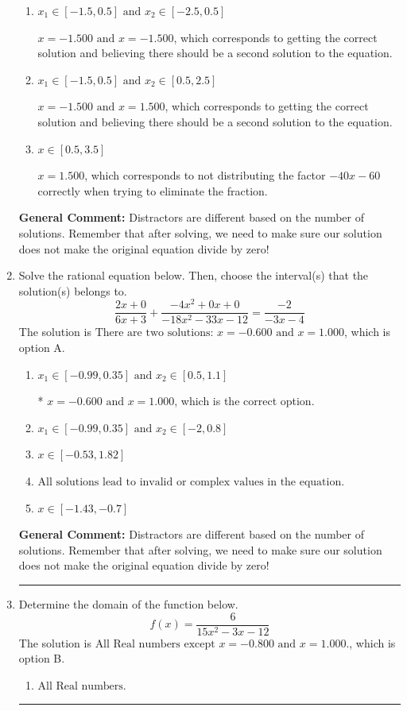 \documentclass{extbook}[14pt]
\newcommand{\litem}[1]{\item #1

\rule{\textwidth}{0.4pt}}
\begin{document}
\begin{enumerate}
{\begin{enumerate}[label=\Alph*.]
$x = -1.500$, which corresponds to not checking if this value leads to dividing by 0 in the original equation and thus is not a valid solution.
\item \( x_1 \in [-1.5, 0.5] \text{ and } x_2 \in [-2.5,0.5] \)

$x = -1.500 \text{ and } x = -1.500$, which corresponds to getting the correct solution and believing there should be a second solution to the equation.
\item \( x_1 \in [-1.5, 0.5] \text{ and } x_2 \in [0.5,2.5] \)

$x = -1.500 \text{ and } x = 1.500$, which corresponds to getting the correct solution and believing there should be a second solution to the equation.
\item \( x \in [0.5,3.5] \)

$x = 1.500$, which corresponds to not distributing the factor $-40x -60$ correctly when trying to eliminate the fraction.
\end{enumerate}

\textbf{General Comment:} Distractors are different based on the number of solutions. Remember that after solving, we need to make sure our solution does not make the original equation divide by zero!
}
\litem{
Solve the rational equation below. Then, choose the interval(s) that the solution(s) belongs to.
\[ \frac{2x + 0}{6x + 3} + \frac{-4x^{2} +0 x + 0}{-18x^{2} -33 x -12} = \frac{-2}{-3x -4} \]The solution is \( \text{There are two solutions: } x = -0.600 \text{ and } x = 1.000 \), which is option A.\begin{enumerate}[label=\Alph*.]
\item \( x_1 \in [-0.99, 0.35] \text{ and } x_2 \in [0.5,1.1] \)

* $x = -0.600 \text{ and } x = 1.000$, which is the correct option.
\item \( x_1 \in [-0.99, 0.35] \text{ and } x_2 \in [-2,0.8] \)


\item \( x \in [-0.53,1.82] \)


\item \( \text{All solutions lead to invalid or complex values in the equation.} \)


\item \( x \in [-1.43,-0.7] \)


\end{enumerate}

\textbf{General Comment:} Distractors are different based on the number of solutions. Remember that after solving, we need to make sure our solution does not make the original equation divide by zero!
}
\litem{
Determine the domain of the function below.
\[ f(x) = \frac{6}{15x^{2} -3 x -12} \]The solution is \( \text{All Real numbers except } x = -0.800 \text{ and } x = 1.000. \), which is option B.\begin{enumerate}[label=\Alph*.]
\item \( \text{All Real numbers.} \)


\end{enumerate}}
\end{enumerate}
\end{document}

